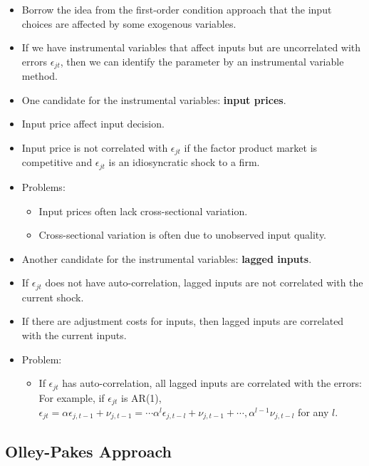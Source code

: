 \documentclass[
]{book}
\providecommand{\tightlist}{%
  \setlength{\itemsep}{0pt}\setlength{\parskip}{0pt}}
\begin{document}
\begin{itemize}
\item
  Borrow the idea from the first-order condition approach that the input choices are affected by some exogenous variables.
\item
  If we have instrumental variables that affect inputs but are uncorrelated with errors \(\epsilon_{jt}\), then we can identify the parameter by an instrumental variable method.
\item
  One candidate for the instrumental variables: \textbf{input prices}.
\item
  Input price affect input decision.
\item
  Input price is not correlated with \(\epsilon_{jt}\) if the factor product market is competitive and \(\epsilon_{jt}\) is an idiosyncratic shock to a firm.
\item
  Problems:

  \begin{itemize}
  \tightlist
  \item
    Input prices often lack cross-sectional variation.
  \item
    Cross-sectional variation is often due to unobserved input quality.
  \end{itemize}
\item
  Another candidate for the instrumental variables: \textbf{lagged inputs}.
\item
  If \(\epsilon_{jt}\) does not have auto-correlation, lagged inputs are not correlated with the current shock.
\item
  If there are adjustment costs for inputs, then lagged inputs are correlated with the current inputs.
\item
  Problem:

  \begin{itemize}
  \tightlist
  \item
    If \(\epsilon_{jt}\) has auto-correlation, all lagged inputs are correlated with the errors: For example, if \(\epsilon_{jt}\) is AR(1), \(\epsilon_{jt} = \alpha \epsilon_{j, t - 1} + \nu_{j, t - 1} = \cdots \alpha^l \epsilon_{j, t - l} + \nu_{j, t - 1} + \cdots, \alpha^{l - 1} \nu_{j, t - l}\) for any \(l\).
  \end{itemize}
\end{itemize}

\hypertarget{olley-pakes-approach}{%
\subsection{Olley-Pakes Approach}\label{olley-pakes-approach}}
\end{document}
